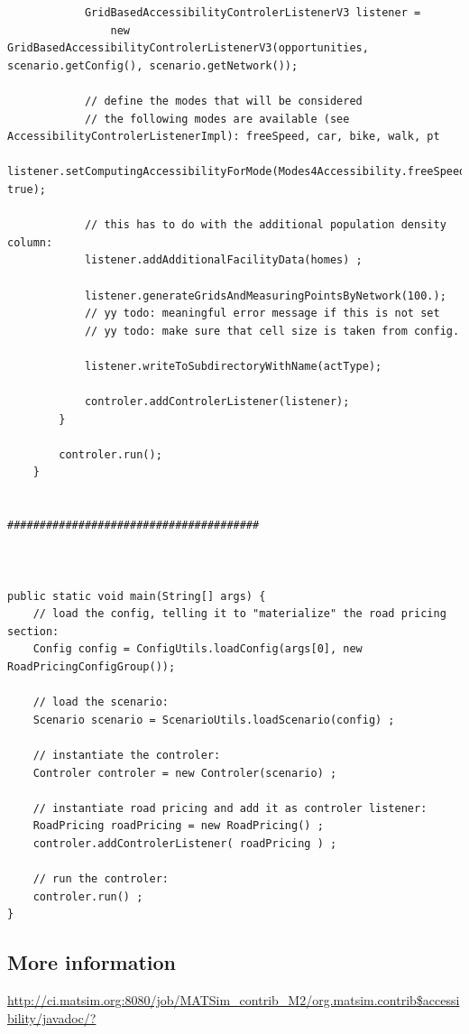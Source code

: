 \begin{lstlisting}
			GridBasedAccessibilityControlerListenerV3 listener = 
				new GridBasedAccessibilityControlerListenerV3(opportunities, scenario.getConfig(), scenario.getNetwork());

			// define the modes that will be considered
			// the following modes are available (see AccessibilityControlerListenerImpl): freeSpeed, car, bike, walk, pt
			listener.setComputingAccessibilityForMode(Modes4Accessibility.freeSpeed, true);

			// this has to do with the additional population density column:
			listener.addAdditionalFacilityData(homes) ;

			listener.generateGridsAndMeasuringPointsByNetwork(100.);
			// yy todo: meaningful error message if this is not set
			// yy todo: make sure that cell size is taken from config.
			
			listener.writeToSubdirectoryWithName(actType);
			
			controler.addControlerListener(listener);
		}
					
		controler.run();
	}


#######################################



public static void main(String[] args) {
	// load the config, telling it to "materialize" the road pricing section:
	Config config = ConfigUtils.loadConfig(args[0], new RoadPricingConfigGroup());
	
	// load the scenario:
	Scenario scenario = ScenarioUtils.loadScenario(config) ;

	// instantiate the controler:
	Controler controler = new Controler(scenario) ;

	// instantiate road pricing and add it as controler listener:
	RoadPricing roadPricing = new RoadPricing() ;
	controler.addControlerListener( roadPricing ) ;

	// run the controler:
	controler.run() ;
}
\end{lstlisting}

\subsection{More information}

\url{http://ci.matsim.org:8080/job/MATSim_contrib_M2/org.matsim.contrib$accessibility/javadoc/?}

